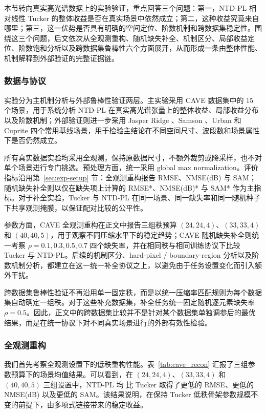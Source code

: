 本节转向真实高光谱数据上的实验验证，重点回答三个问题：第一，NTD-PL 相对线性 Tucker 的整体收益是否在真实场景中依然成立；第二，这种收益究竟来自哪里；第三，这一优势是否具有明确的空间定位、阶数机制和跨数据集稳定性。围绕这三个问题，后文依次从全观测重构、随机缺失补全、机制区分、局部收益定位、阶数饱和分析以及跨数据集鲁棒性六个方面展开，从而形成一条由整体性能、机制解释到外部验证的完整证据链。

\subsubsection{数据与协议}

实验分为主机制分析与外部鲁棒性验证两层。主实验采用 CAVE \cite{cave_multispectral_database,yasuma2010gapc} 数据集中的 $15$ 个场景，用于系统分析 NTD-PL 在真实高光谱张量上的整体收益、局部收益分布以及阶数机制；外部验证则进一步采用 Jasper Ridge \cite{roberts1993jasperridge}、Samson \cite{davis2007samson}、Urban \cite{urban_hypercube_dataset} 和 Cuprite \cite{resmini1997cuprite} 四个常用基线场景，用于检验主结论在不同空间尺寸、波段数和场景属性下是否仍然成立。

所有真实数据实验均采用全观测，保持原数据尺寸，不额外裁剪或降采样，也不对单个场景进行专门挑选。预处理方面，统一采用 global max normalization。评价指标沿用第~\ref{sec:exp-setup} 节：全观测重构报告 RMSE、NMSE(dB) 与 SAM；随机缺失补全则以仅在缺失项上计算的 RMSE*、NMSE(dB)* 与 SAM* 作为主指标。对于补全实验，Tucker 与 NTD-PL 在同一场景、同一缺失率和同一随机种子下共享观测掩膜，以保证配对比较的公平性。

参数方面，CAVE 全观测重构在正文中报告三组秩预算 $(24,24,4)$、$(33,33,4)$ 和 $(40,40,5)$，用于观察不同压缩水平下的稳定趋势；CAVE 随机缺失补全则统一考察 $\rho=0.1,0.3,0.5,0.7$ 四个缺失率，并在相同秩与相同训练协议下比较 Tucker 与 NTD-PL。后续的机制区分、hard-pixel / boundary-region 分析以及阶数机制分析，都建立在这一统一补全协议之上，以避免由于任务设置变化而引入额外干扰。

跨数据集鲁棒性验证不再沿用单一固定秩，而是以统一压缩率匹配规则为每个数据集自动确定一组秩。对于这些补充数据集，补全任务统一固定随机逐元素缺失率 $\rho=0.5$。因此，正文中的跨数据集比较并不是针对某个数据集单独调参后的最优结果，而是在统一协议下对不同真实场景进行的外部有效性检验。

\subsubsection{全观测重构}

我们首先考察全观测设置下的低秩重构性能。表~\ref{tab:cave_recon} 汇报了三组参数预算下的场景均值结果。可以看到，在 $(24,24,4)$、$(33,33,4)$ 和 $(40,40,5)$ 三组设置中，NTD-PL 均 比 Tucker 取得了更低的 RMSE、更低的 NMSE(dB) 以及更低的 SAM。该结果说明，在保持 Tucker 低秩骨架参数规模不变的前提下，由多项式链接带来的稳定收益。

